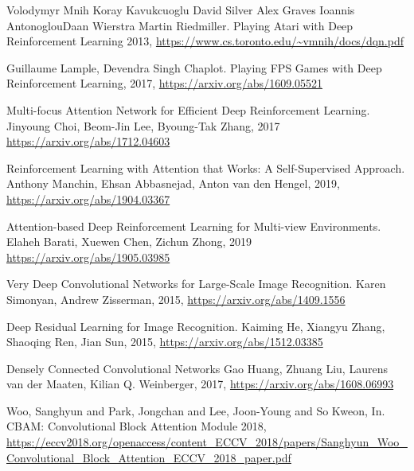\documentclass[10pt,a4paper]{article}
\begin{document}
\newpage
\begin{thebibliography}{9}

Volodymyr Mnih   Koray Kavukcuoglu   David Silver   Alex Graves   Ioannis AntonoglouDaan Wierstra   Martin Riedmiller.
Playing Atari with Deep Reinforcement Learning 2013, \url{https://www.cs.toronto.edu/~vmnih/docs/dqn.pdf}

Guillaume Lample, Devendra Singh Chaplot.
Playing FPS Games with Deep Reinforcement Learning, 2017, \url{https://arxiv.org/abs/1609.05521}


Multi-focus Attention Network for Efficient Deep Reinforcement Learning.
Jinyoung Choi, Beom-Jin Lee, Byoung-Tak Zhang, 2017 \url{https://arxiv.org/abs/1712.04603}

Reinforcement Learning with Attention that Works: A Self-Supervised Approach.
Anthony Manchin, Ehsan Abbasnejad, Anton van den Hengel, 2019, \url{https://arxiv.org/abs/1904.03367}

Attention-based Deep Reinforcement Learning for Multi-view Environments.
Elaheh Barati, Xuewen Chen, Zichun Zhong, 2019 \url{https://arxiv.org/abs/1905.03985}

Very Deep Convolutional Networks for Large-Scale Image Recognition.
Karen Simonyan, Andrew Zisserman, 2015, \url{https://arxiv.org/abs/1409.1556}

Deep Residual Learning for Image Recognition.
Kaiming He, Xiangyu Zhang, Shaoqing Ren, Jian Sun, 2015, \url{https://arxiv.org/abs/1512.03385}

Densely Connected Convolutional Networks
Gao Huang, Zhuang Liu, Laurens van der Maaten, Kilian Q. Weinberger, 2017, \url{https://arxiv.org/abs/1608.06993}


Woo, Sanghyun and Park, Jongchan and Lee, Joon-Young and So Kweon, In.
CBAM: Convolutional Block Attention Module 2018, \url{https://eccv2018.org/openaccess/content_ECCV_2018/papers/Sanghyun_Woo_Convolutional_Block_Attention_ECCV_2018_paper.pdf}


\end{thebibliography}
\end{document}
